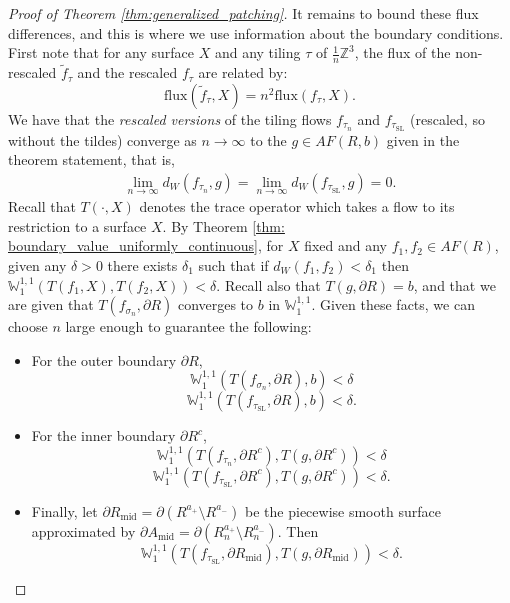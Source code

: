 \documentclass[10pt,a4paper]{amsart}
\newcommand{\m}[1]{\mathbb{#1}}
\begin{document}
\begin{proof}[Proof of Theorem \ref{thm:generalized_patching}]
    It remains to bound these flux differences, and this is where we use information about the boundary conditions. First note that for any surface $X$ and any tiling $\tau$ of $\frac{1}{n}\m Z^3$, the flux of the non-rescaled $\widetilde f_\tau$ and the rescaled $f_\tau$ are related by:
    \begin{equation}\label{eq:differ_by_n2}
        \text{flux}(\widetilde f_\tau,X) = n^2 \text{flux}(f_\tau,X).  
    \end{equation}
    We have that the \textit{rescaled versions} of the tiling flows $f_{\tau_n}$ and $f_{\tau_{\text{SL}}}$ (rescaled, so without the tildes) converge as $n\to \infty$ to the $g\in AF(R,b)$ given in the theorem statement, that is, 
    \begin{align*}
        \lim_{n\to \infty} d_W( f_{\tau_n},g) = \lim_{n\to \infty}d_W( f_{\tau_{\text{SL}}}, g) =0.
    \end{align*}
    Recall that $T(\cdot, X)$ denotes the trace operator which takes a flow to its restriction to a surface $X$. By Theorem \ref{thm: boundary_value_uniformly_continuous}, for $X$ fixed and any $f_1,f_2\in AF(R)$, given any $\delta>0$ there exists $\delta_1$ such that if $d_W(f_1,f_2)< \delta_1$ then $\m W_1^{1,1}(T(f_1,X),T(f_2,X))<\delta$. Recall also that $T(g,\partial R) = b$, and that we are given that $T(f_{\sigma_n},\partial R)$ converges to $b$ in $\m W_1^{1,1}$. Given these facts, we can choose $n$ large enough to guarantee the following: 
    \begin{itemize}
        \item For the outer boundary $\partial R$, 
        \begin{equation}\label{eq:bound1}
        \m W_1^{1,1}(T( f_{\sigma_n},\partial R), b) < \delta
        \end{equation}
        \begin{equation}\label{eq:bound2}
            \m W_1^{1,1}(T( f_{\tau_{\text{SL}}},\partial R), b) < \delta.
        \end{equation}
        \item For the inner boundary $\partial R^c$,
        \begin{equation}\label{eq:bound3}
            \m W_1^{1,1}(T( f_{\tau_n},\partial R^c),T(g,\partial R^c))<\delta
        \end{equation}
        \begin{equation}\label{eq:bound4}
            \m W_1^{1,1}(T( f_{\tau_{\text{SL}}},\partial R^c),T(g,\partial R^c))<\delta.
        \end{equation}
        \item Finally, let $\partial R_{\text{mid}}=\partial (R^{a_+}\setminus R^{a_-})$ be the piecewise smooth surface approximated by $\partial A_{\text{mid}}= \partial(R_n^{a_+}\setminus R_n^{a_-})$. Then  
        \begin{equation}\label{eq:bound5}
            \m W_1^{1,1}(T( f_{\tau_{\text{SL}}},\partial R_{\text{mid}}),T(g,\partial R_{\text{mid}}))<\delta.
        \end{equation}
    \end{itemize}   


\end{proof}
\end{document}
